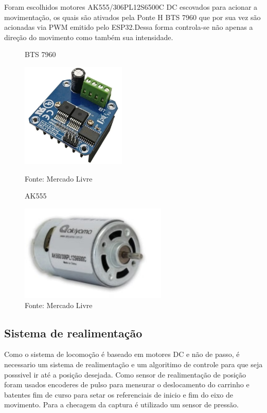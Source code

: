 \documentclass[../poliXuniversity_hospital_(USP)_report.tex]{subfiles}
\begin{document}
Foram escolhidos motores AK555/306PL12S6500C DC escovados para acionar a movimentação, os quais são ativados pela Ponte H BTS 7960 que por sua vez são acionadas via PWM emitido pelo ESP32.Dessa forma controla-se não apenas a direção do movimento como também sua intensidade.
\begin{figure}[h]
\centering
    \begin{minipage}{0.5\textwidth}
        \centering
        \caption{BTS 7960}
        \centering %
        \includegraphics[width=5cm]{images/BTS.jpg}
        \caption*{Fonte: Mercado Livre}
        \label{figura: BTS 7960}
        
    \end{minipage}\hfill
    \begin{minipage}{0.5\textwidth}
    
        \centering
        \caption{AK555}
        \centering %
        \includegraphics[width=7cm]{images/motor_golgi.jpg}
        \caption*{Fonte: Mercado Livre}
        \label{figura: AK555}
        
    \end{minipage}\hfill
\end{figure}

\subsection{Sistema de realimentação}

Como o sistema de locomoção é baseado em motores DC e não de passo, é necessario um sistema de realimentação e um algoritimo de controle para que seja posssivel ir até a posição desejada. Como sensor de realimentação de posição foram usados encoderes de pulso para mensurar o deslocamento do carrinho e batentes fim de curso para setar os referenciais de inicio e fim do eixo de movimento. Para a checagem da captura é utilizado um sensor de pressão.
\end{document}
